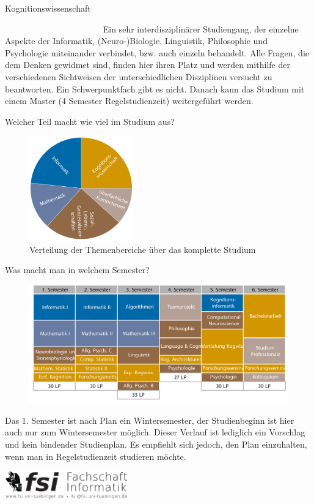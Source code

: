 	\begin{Huge}
			Kognitionswissenschaft
		\end{Huge}
		\begin{exampleblock}{\textcolor{white}{Was ist der Studiengang?}}
			Ein sehr interdisziplinärer Studiengang, der einzelne Aspekte der Informatik, (Neuro-)Biologie, Linguistik, Philosophie und Psychologie miteinander verbindet, bzw. auch einzeln behandelt. Alle Fragen, die dem Denken gewidmet sind, finden hier ihren Platz und werden mithilfe der verschiedenen Sichtweisen der unterschiedlichen Disziplinen versucht zu beantworten. Ein Schwerpunktfach gibt es nicht. Danach kann das Studium mit einem Master (4 Semester Regelstudienzeit) weitergeführt werden.
		\end{exampleblock}
	\begin{block}{Welcher Teil macht wie viel im Studium aus?}
		\begin{figure}[h!]
			\includegraphics[width=0.4\textwidth]{charts/kognitionswissenschaft-Piechart.pdf}
			\caption{Verteilung der Themenbereiche über das komplette Studium}
		\end{figure}
	\end{block}
	\begin{block}{Was macht man in welchem Semester?}
		\begin{figure}[h!]
			\includegraphics[width=\textwidth]{charts/kognitionswissenschaft_StudienplanabWS18.pdf}
		\end{figure}
		Das 1. Semester ist nach Plan ein Wintersemester, der Studienbeginn ist hier auch nur zum Wintersemester möglich. 
		Dieser Verlauf ist lediglich ein Vorschlag und kein bindender Studienplan. Es empfiehlt sich jedoch, den Plan einzuhalten, wenn man in Regelstudienzeit studieren möchte.
	\end{block}
\vfill
\begin{flushright}
	\includegraphics[width=0.4\textwidth]{fsilogo.pdf}
\end{flushright}